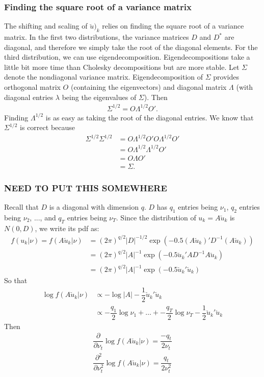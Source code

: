 \documentclass{article}
\begin{document}
\subsubsection{Finding the square root of a variance matrix}\label{sec:sqrtmat}
The shifting and scaling of $\breve{u})_k$ relies on finding the square root of a variance matrix. In the first two distributions, the variance matrices $D$ and $D^*$ are diagonal, and therefore we simply take the root of the diagonal elements. For the third distribution, we can use eigendecomposition. Eigendecompositions take a little bit more time than Cholesky decompositions but are more stable. Let $\Sigma$ denote the nondiagonal variance matrix. Eigendecomposition of $\Sigma$ provides orthogonal matrix $O$ (containing the eigenvectors) and diagonal matrix $\Lambda$ (with diagonal entries $\lambda$ being the eigenvalues of $\Sigma$).  Then
\begin{align}
\Sigma^{1/2}= O \Lambda^{1/2} O'.
\end{align}
Finding $\Lambda^{1/2}$ is as easy as taking the root of the diagonal entries.  We know that $\Sigma^{1/2}$ is correct because
\begin{align}
\Sigma^{1/2} \Sigma^{1/2} &= O \Lambda^{1/2} O'O \Lambda^{1/2} O'\\ \nonumber
&= O \Lambda^{1/2}\Lambda^{1/2} O'\\\nonumber
&=O \Lambda O' \\\nonumber
&= \Sigma.
\end{align}

 
\subsubsection{NEED TO PUT THIS SOMEWHERE}


Recall that $D$ is a diagonal with dimension $q$. $D$ has $q_1$ entries being $\nu_1$, $q_2$ entries being $\nu_2$, ..., and $q_T$ entries being $\nu_T$. Since the distribution of $u_k=A \breve{u}_k$ is $N(0,D)$, we write its pdf as:
\begin{align}
f(u_k|\nu)=f(A\breve{u}_k|\nu)&= (2 \pi)^{q/2} |D|^{-1/2} \exp(-0.5 (A \breve{u}_k)' D^{-1} (A \breve{u}_k))\\
&=(2 \pi)^{q/2} |A|^{-1} \exp(-0.5 \breve{u}_k' A D^{-1} A \breve{u}_k)\\
&=(2 \pi)^{q/2} |A|^{-1} \exp(-0.5 \breve{u}_k' \breve{u}_k)
\end{align}
So that 
\begin{align}
\log f(A \breve{u}_k|\nu) &\propto - \log |A| -\dfrac{1}{2} \breve{u}_k' \breve{u}_k\\
&\propto -\dfrac{q_1}{2} \log \nu_1 +\ldots + -\dfrac{q_T}{2} \log \nu_T -\dfrac{1}{2} \breve{u}_k' \breve{u}_k
\end{align}
Then 
\begin{align}
\dfrac{\partial}{\partial \nu_t} \log f(A \breve{u}_k|\nu) = \dfrac{-q_t}{2 \nu_t}\\
\dfrac{\partial^2}{\partial \nu_t^2} \log f(A \breve{u}_k|\nu) = \dfrac{q_t}{2 \nu_t^2}
\end{align}
\end{document}

